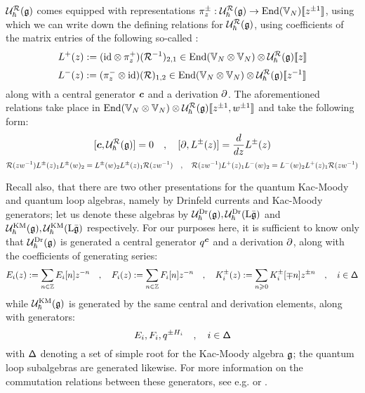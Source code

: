             $\mathcal{U}_{\hbar}^{\mathcal{R}}(\mathfrak{g})$ comes equipped with representations $\pi_z^{\pm}: \mathcal{U}_{\hbar}^{\mathcal{R}}(\mathfrak{g}) \to \operatorname{End}(\mathbb{V}_N)[\![z^{\pm 1}]\!]$, using which we can write down the defining relations for $\mathcal{U}_{\hbar}^{\mathcal{R}}(\mathfrak{g})$, using coefficients of the matrix entries of the following so-called :
                $$L^+(z) := (\id \tensor \pi_z^+)( \calR^{-1} )_{2, 1} \in \End(\bbV_N \tensor \bbV_N) \tensor \calU_{\hbar}^{\calR}(\g)[\![z]\!]$$
                $$L^-(z) := (\pi_z^- \tensor \id)( \calR )_{1, 2} \in \End(\bbV_N \tensor \bbV_N) \tensor \calU_{\hbar}^{\calR}(\g)[\![z^{-1}]\!]$$
            along with a central generator $\boldsymbol{c}$ and a derivation $\partial$. The aforementioned relations take place in $\End(\bbV_N \tensor \bbV_N) \tensor \calU_{\hbar}^{\calR}(\g)[\![z^{\pm 1}, w^{\pm 1}]\!]$ and take the following form:
                $$[\boldsymbol{c}, \mathcal{U}_{\hbar}^{\mathcal{R}}(\mathfrak{g})] = 0 \quad, \quad [\partial, L^{\pm}(z)] = \frac{d}{dz} L^{\pm}(z)$$
                \begin{equation} \label{equation: RLL_relations}
                    \mathcal{R}(zw^{-1}) L^{\pm}(z)_1 L^{\pm}(w)_2 = L^{\pm}(w)_2 L^{\pm}(z)_1 \mathcal{R}(zw^{-1}) \quad, \quad \mathcal{R}(zw^{-1}) L^+(z)_1 L^-(w)_2 = L^-(w)_2 L^+(z)_1 \mathcal{R}(zw^{-1})
                \end{equation}
            
            Recall also, that there are two other presentations for the quantum Kac-Moody and quantum loop algebras, namely by Drinfeld currents and Kac-Moody generators; let us denote these algebras by $\mathcal{U}_{\hbar}^{\mathrm{Dr}}(\mathfrak{g}), \mathcal{U}_{\hbar}^{\mathrm{Dr}}(\mathrm{L} \bar{\mathfrak{g}})$ and $\mathcal{U}_{\hbar}^{\mathrm{KM}}(\mathfrak{g}), \mathcal{U}_{\hbar}^{\mathrm{KM}}(\mathrm{L} \bar{\mathfrak{g}})$ respectively. For our purposes here, it is sufficient to know only that $\mathcal{U}_{\hbar}^{\mathrm{Dr}}(\mathfrak{g})$ is generated a central generator $q^{\boldsymbol{c}}$ and a derivation $\partial$, along with the coefficients of generating series:
                $$E_i(z) := \sum_{n \in \mathbb{Z}} E_i[n] z^{-n} \quad, \quad F_i(z) := \sum_{n \in \mathbb{Z}} F_i[n] z^{-n} \quad, \quad K^{\pm}_i(z) := \sum_{n \geqslant 0} K^{\pm}_i[\mp n] z^{\pm n} \quad, \quad i \in \mathsf{\Delta}$$
            while $\mathcal{U}_{\hbar}^{\mathrm{KM}}(\mathfrak{g})$ is generated by the same central and derivation elements, along with generators:
                $$E_i, F_i, q^{\pm H_i} \quad, \quad i \in \mathsf{\Delta}$$
            with $\mathsf{\Delta}$ denoting a set of simple root for the Kac-Moody algebra $\mathfrak{g}$; the quantum loop subalgebras are generated likewise. For more information on the commutation relations between these generators, see e.g. \cite[Section 2]{ding_pakuliak_khoroshkin_integral_formula_for_R_matrices_of_affine_QUEs} or \cite[Section 3]{frenkel_reshetikhin_affine_QUEs_and_deformed_virasoro_and_finite_W_algebras}. 
            
